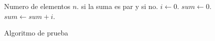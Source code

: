 \documentclass{article}
\begin{document}
\begin{algorithm}
\begin{algorithmic}[1]
\REQUIRE Numero de elementos $n$.
\ENSURE \TRUE si la suma es par y \FALSE si no.
\STATE $i \leftarrow 0$.
\STATE $sum \leftarrow 0$.
\STATE $sum \leftarrow sum + i$.
\ENDWHILE
{}
\RETURN \TRUE
\ELSE
\RETURN \FALSE
\ENDIF
\end{algorithmic}
\caption{Algoritmo de prueba}
\label{alg:algoritmo}
\end{algorithm}
\end{document}
